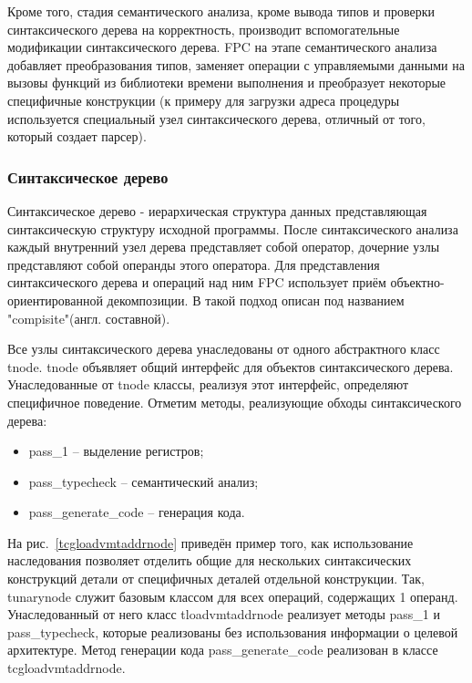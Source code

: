 \documentclass{imcs}
\begin{document}
Кроме того, стадия семантического анализа, кроме вывода типов и проверки синтаксического
дерева на корректность, производит вспомогательные модификации синтаксического дерева.
FPC на этапе семантического анализа добавляет преобразования типов, заменяет операции
с управляемыми данными на вызовы функций из библиотеки времени выполнения и преобразует
некоторые специфичные конструкции (к примеру для загрузки адреса процедуры используется
специальный узел синтаксического дерева, отличный от того, который создает парсер).

\subsubsection{Синтаксическое дерево}

Синтаксическое дерево - иерархическая структура данных представляющая синтаксическую
структуру исходной программы\cite{dragonbook}. После синтаксического анализа каждый внутренний узел 
дерева представляет собой оператор, дочерние узлы представляют собой операнды этого
оператора. Для представления синтаксического дерева и операций над ним FPC использует
приём объектно-ориентированной декомпозиции. В \cite{gof} такой подход описан под
названием "compisite"(англ. составной).

Все узлы синтаксического дерева унаследованы от одного абстрактного класс tnode.
tnode объявляет общий интерфейс для объектов синтаксического дерева. Унаследованные
от tnode классы, реализуя этот интерфейс, определяют специфичное поведение. Отметим
методы, реализующие обходы синтаксического дерева:
\begin{itemize}
    \item pass\_1 -- выделение регистров;
    \item pass\_typecheck -- семантический анализ;
    \item pass\_generate\_code -- генерация кода.
\end{itemize}

На рис.~\ref{tcgloadvmtaddrnode} приведён пример того, как использование
наследования позволяет отделить общие для 
нескольких синтаксических конструкций детали от специфичных деталей отдельной конструкции.
Так, tunarynode служит базовым классом для всех операций, содержащих 1 операнд.
Унаследованный от него класс tloadvmtaddrnode реализует методы pass\_1 и pass\_typecheck,
которые реализованы без использования информации о целевой архитектуре. Метод
генерации кода pass\_generate\_code реализован в классе \\ tcgloadvmtaddrnode.
\end{document}
